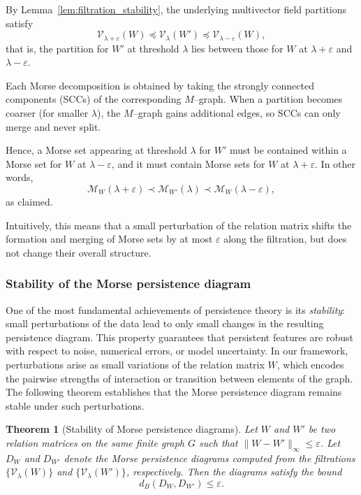 \documentclass{article}
\theoremstyle{definition}
\theoremstyle{plain}
\newtheorem{theorem}{Theorem}
\theoremstyle{remark}
\newcommand{\1}{\mathbbm{1}}  %
\renewenvironment{proof}{{\bf Proof:\ }}{\qedsymbol}%
\begin{document}
\begin{proof}
By Lemma~\ref{lem:filtration_stability}, 
the underlying multivector field partitions satisfy
\[
\mathcal V_{\lambda+\varepsilon}(W)
  \preceq
\mathcal V_{\lambda}(W')
  \preceq
\mathcal V_{\lambda-\varepsilon}(W),
\]
that is, the partition for $W'$ at threshold $\lambda$ lies between those
for $W$ at $\lambda+\varepsilon$ and $\lambda-\varepsilon$.

Each Morse decomposition is obtained by taking the strongly connected 
components (SCCs) of the corresponding $M$--graph. 
When a partition becomes coarser (for smaller $\lambda$), 
the $M$--graph gains additional edges, 
so SCCs can only merge and never split.

Hence, a Morse set appearing at threshold $\lambda$ for $W'$ 
must be contained within a Morse set for $W$ at $\lambda-\varepsilon$, 
and it must contain Morse sets for $W$ at $\lambda+\varepsilon$. 
In other words,
\[
\mathcal M_W(\lambda+\varepsilon)
  \prec
\mathcal M_{W'}(\lambda)
  \prec
\mathcal M_W(\lambda-\varepsilon),
\]
as claimed.

Intuitively, this means that a small perturbation of the relation matrix 
shifts the formation and merging of Morse sets by at most $\varepsilon$ 
along the filtration, but does not change their overall structure.
\end{proof}

\subsubsection{Stability of the Morse persistence diagram}
\label{sec:stability-morse}

One of the most fundamental achievements of persistence theory is its
\emph{stability}: small perturbations of the data lead to only small
changes in the resulting persistence diagram.
This property guarantees that persistent features are robust with respect
to noise, numerical errors, or model uncertainty.
In our framework, perturbations arise as small variations of the relation
matrix $W$, which encodes the pairwise strengths of interaction or
transition between elements of the graph.
The following theorem establishes that the Morse persistence diagram
remains stable under such perturbations.

\begin{theorem}[Stability of Morse persistence diagrams]
\label{thm:diagram_stability}
Let $W$ and $W'$ be two relation matrices on the same finite graph $G$
such that $\|W - W'\|_\infty \le \varepsilon$.
Let $D_W$ and $D_{W'}$ denote the Morse persistence diagrams computed from
the filtrations $\{\mathcal V_\lambda(W)\}$ and
$\{\mathcal V_\lambda(W')\}$, respectively.
Then the diagrams satisfy the bound
\[
d_B(D_W, D_{W'}) \le \varepsilon.
\]
\end{theorem}
\end{document}
